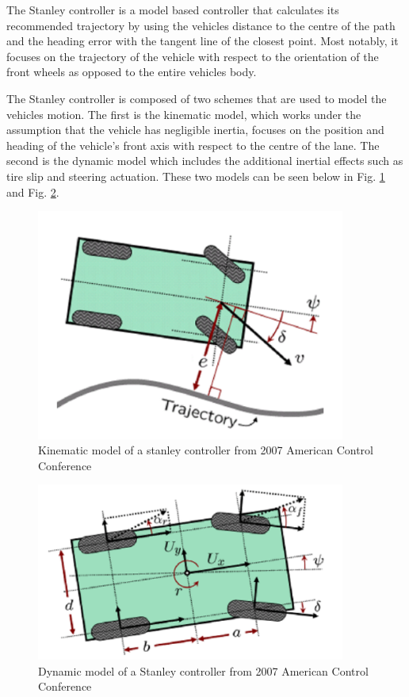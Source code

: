 \documentclass[titlepage,draft]{article}
\begin{document}
{The Stanley controller is a model based controller that calculates its recommended trajectory by using the vehicles distance to the centre of the path and the heading error with the tangent line of the closest point. Most notably, it focuses on the trajectory of the vehicle with respect to the orientation of the front wheels as opposed to the entire vehicles body\cite{4282788}.

The Stanley controller is composed of two schemes that are used to model the vehicles motion. The first is the kinematic model, which works under the assumption that the vehicle has negligible inertia, focuses on the position and heading of the vehicle's front axis with respect to the centre of the lane. The second is the dynamic model which includes the additional inertial effects such as tire slip and steering actuation. These two models can be seen below in Fig. \ref{fig:stankine} and Fig. \ref{fig:standyna}.

\begin{figure}
	\centering
	\includegraphics[width=4in]{stanley_kinematic}
	\caption{Kinematic model of a stanley controller from 2007 American Control Conference \cite{4282788}}
	\label{fig:stankine}
\end{figure}

\begin{figure}
	\centering
	\includegraphics[width=4in]{stanley_dynamic}
	\caption{Dynamic model of a Stanley controller from 2007 American Control Conference \cite{4282788}}
	\label{fig:standyna}
\end{figure}

}
\end{document}
